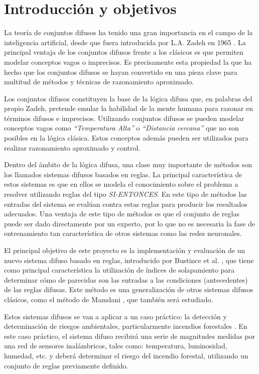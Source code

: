 \chapter{Introducción y objetivos}
La teoría de conjuntos difusos ha tenido una gran importancia en el campo de la inteligencia artificial, desde que fuera introducida por L.A. Zadeh en 1965 \cite{Zadeh65}. La principal ventaja de los conjuntos difusos frente a los clásicos es que permiten modelar conceptos vagos o imprecisos. Es precisamente esta propiedad la que ha hecho que los conjuntos difusos se hayan convertido en una pieza clave para multitud de métodos y técnicas de razonamiento aproximado.

Los conjuntos difusos constituyen la base de la lógica difusa que, en palabras del propio Zadeh, pretende emular la habilidad de la mente humana para razonar en términos difusos e imprecisos. Utilizando conjuntos difusos se pueden modelar conceptos vagos como \emph{``Temperatura Alta''} o \emph{``Distancia cercana''} que no son posibles en la lógica clásica. Estos conceptos además pueden ser utilizados para realizar razonamiento aproximado y control.

Dentro del ámbito de la lógica difusa, una clase muy importante de métodos son los llamados sistemas difusos basados en reglas. La principal característica de estos sistemas es que en ellos se modela el conocimiento sobre el problema a resolver utilizando reglas del tipo \emph{SI-ENTONCES}. En este tipo de métodos las entradas del sistema se evalúan contra estas reglas para producir los resultados adecuados. Una ventaja de este tipo de métodos es que el conjunto de reglas puede ser dado directamente por un experto, por lo que no es necesaria la fase de entrenamiento tan característica de otros sistemas como las redes neuronales.

El principal objetivo de este proyecto es la implementación y evaluación de un nuevo sistema difuso basado en reglas, introducido por Bustince et al. \cite{bustince2013overlap}, que tiene como principal característica la utilización de índices de solapamiento para determinar cómo de parecidas son las entradas a las condiciones (antecedentes) de las reglas difusas. Este método es una generalización de otros sistemas difusos clásicos, como el método de Mamdani \cite{Mamdani1975}, que también será estudiado.

Estos sistemas difusos se van a aplicar a un caso práctico: la detección y determinación de riesgos ambientales, particularmente incendios forestales \cite{bolourchi2013}. En este caso práctico, el sistema difuso recibirá una serie de magnitudes medidas por una red de sensores inalámbricos, tales como: temperatura, luminosidad, humedad, etc. y deberá determinar el riesgo del incendio forestal, utilizando un conjunto de reglas previamente definido.

